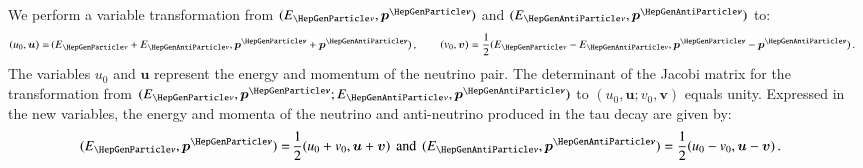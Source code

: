 We perform a variable transformation from $(E_{\Pnu}, \bm{p^{\Pnu}})$
and $(E_{\APnu}, \bm{p^{\APnu}})$ to:
\begin{align}
(u_{0}, \bm{u}) = & \, (E_{\Pnu} + E_{\APnu}, \bm{p^{\Pnu}} +
\bm{p^{\APnu}}) \, , \qquad (v_{0}, \bm{v}) = \frac{1}{2} (
  E_{\Pnu} - E_{\APnu}, \bm{p^{\Pnu}} - \bm{p^{\APnu}} ) \, . \nonumber 
\end{align}
The variables $u_{0}$ and $\bm{u}$ represent the energy and momentum of the neutrino pair.
The determinant of the Jacobi matrix for the transformation from
$(E_{\Pnu}, \bm{p^{\Pnu}}; E_{\APnu}, \bm{p^{\APnu}})$
to $(u_{0}, \bm{u}; v_{0}, \bm{v})$ equals unity.
Expressed in the new variables, the energy and momenta of the neutrino and anti-neutrino produced in the tau decay are given by:
\begin{align}
( E_{\Pnu}, \bm{p^{\Pnu}} ) = & \, \frac{1}{2} ( u_{0} + v_{0}, \bm{u}
+ \bm{v} ) \, \mbox{ and } \, ( E_{\APnu}, \bm{p^{\APnu}} ) = \frac{1}{2} (
u_{0} - v_{0}, \bm{u} - \bm{v} ) \, . \nonumber 
\end{align}

